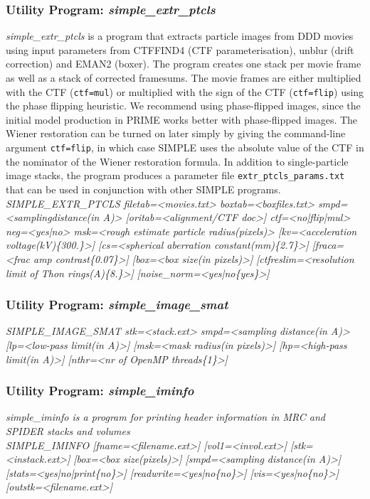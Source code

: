 \documentclass[review]{elsarticle}
\begin{document}
{{\subsubsection{Utility Program: {\it{simple\_extr\_ptcls}}}
\label{extr_ptcls}
{\it{simple\_extr\_ptcls}} is a program that extracts particle images from DDD movies using input parameters from CTFFIND4 (CTF parameterisation), unblur (drift correction) and EMAN2 (boxer). The program creates one stack per movie frame as well as a stack of corrected framesums. The movie frames are either multiplied with the CTF (\texttt{ctf=mul}) or multiplied with the sign of the CTF (\texttt{ctf=flip}) using the phase flipping  heuristic. We recommend using phase-flipped images, since the initial model production in PRIME works better with phase-flipped images. The Wiener restoration can be turned on later simply by giving the command-line argument \texttt{ctf=flip}, in which case SIMPLE uses the absolute value of the CTF in the nominator of the Wiener restoration formula. In addition to single-particle image stacks, the program produces a parameter file \texttt{extr\_ptcls\_params.txt} that can be used in conjunction with other SIMPLE programs.\\
{\it{SIMPLE\_EXTR\_PTCLS filetab=<movies.txt> boxtab=<boxfiles.txt>}}
{\it{smpd=<samplingdistance(in A)> [oritab=<alignment/CTF doc>] ctf=<no|flip|mul>}}
{\it{neg=<yes|no> msk=<rough estimate particle radius(pixels)> [kv=<acceleration}}
{\it{voltage(kV)\{300.\}>] [cs=<spherical aberration constant(mm)\{2.7\}>]}}
{\it{[fraca=<frac amp contrast\{0.07\}>] [box=<box size(in pixels)>]}}
{\it{[ctfreslim=<resolution limit of Thon rings(A)\{8.\}>]}}
{\it{[noise\_norm=<yes|no\{yes\}>]}}

\subsubsection{Utility Program: {\it{simple\_image\_smat}}}
\label{image_smat}
{\it{SIMPLE\_IMAGE\_SMAT stk=<stack.ext> smpd=<sampling distance(in A)>}}
{\it{[lp=<low-pass limit(in A)>] [msk=<mask radius(in pixels)>] [hp=<high-pass}}
{\it{limit(in A)>] [nthr=<nr of OpenMP threads\{1\}>]}}

\subsubsection{Utility Program: {\it{simple\_iminfo}}}
\label{iminfo}
{\it{simple\_iminfo} is a program for printing header information in MRC and SPIDER stacks and volumes}\\
{\it{SIMPLE\_IMINFO [fname=<filename.ext>] [vol1=<invol.ext>] [stk=<instack.ext>]}}
{\it{[box=<box size(pixels)>] [smpd=<sampling distance(in A)>]}}
{\it{[stats=<yes|no|print\{no\}>] [readwrite=<yes|no\{no\}>] [vis=<yes|no\{no\}>]}}
{\it{[outstk=<filename.ext>]}}

}}
\end{document}
